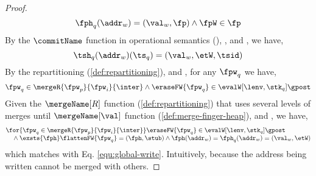 \begin{proof}
\begin{equation}
    \fph_{q}(\addr_{w}) = (\val_{w}, \fp)
    \land \fpW \in \fp
\end{equation}
By the \( \commitName \) function in operational semantics (), ,  and , we have,
\begin{equation}
    \label{equ:global-write}
    \tsh_{q}(\addr_{w})(\ts_{q}) = (\val_{w}, \etW, \tsid)
\end{equation}
By the repartitioning ( \ref{def:repartitioning}),  and , for any \( \fpw_{q} \) we have,
\begin{equation*}
    \fpw_{q} \in \mergeR{\fpw_{p}}{\fpw_{i}}{\inter} \land \eraseFW{\fpw_{q}} \in \evalW[\lenv, \stk_{q}]{\gpost}
\end{equation*}
Given the \( \mergeName[R] \) function ( \ref{def:repartitioning}) that uses several levels of merges until \( \mergeName[\val] \) function ( \ref{def:merge-finger-heap}),  and , we have,
\begin{equation}
    \label{equ:write-remain-the-same}
    \begin{array}{@{}l@{}}
      \for{ \fpw_{q} \in \mergeR{\fpw_{p}}{\fpw_{i}}{\inter} }  
      \eraseFW{\fpw_{q}} \in \evalW[\lenv, \stk_{q}]{\gpost} \\
      \quad {} \land \exsts{\fph} \flattenFW{\fpw_{q}} = (\fph, \stub) \land \fph(\addr_{w}) = \fph_{q}(\addr_{w}) = (\val_{w}, \etW)
    \end{array}
\end{equation}
which matches with Eq. \eqref{equ:global-write}.
Intuitively, because the address being written cannot be merged with others.


\end{proof}

